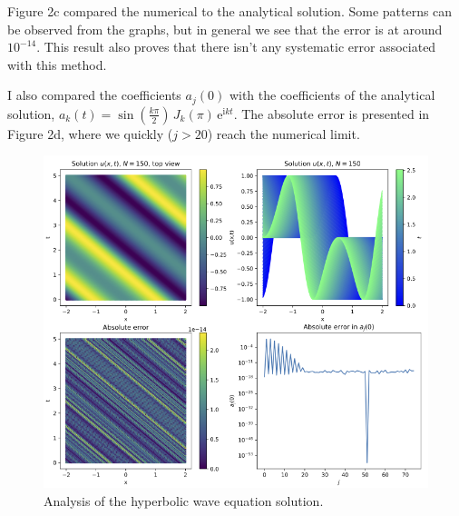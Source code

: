 \documentclass[12pt, a4paper]{article}
\begin{document}
Figure 2c compared the numerical to the analytical solution. Some patterns can be observed from the graphs, but in general we see that the error is at around $10^{-14}$. This result also proves that there isn't any systematic error associated with this method. 

I also compared the coefficients $a_j(0)$ with the coefficients of the analytical solution, $a_k(t)=\sin\left(\frac{k\pi}{ 2}\right)\,J_k(\pi)\,\mathrm{e}^{\mathrm{i}kt}$. The absolute error is presented in Figure 2d, where we quickly ($j > 20$) reach the numerical limit.

\begin{figure}[hbtp]
  \begin{center}
  \includegraphics[width=13cm]{../graphs/dodatna_solution2 copy.png}
  \end{center}
  \vspace*{-7mm}
  \caption{Analysis of the hyperbolic wave equation solution.}
\end{figure}
\end{document}
